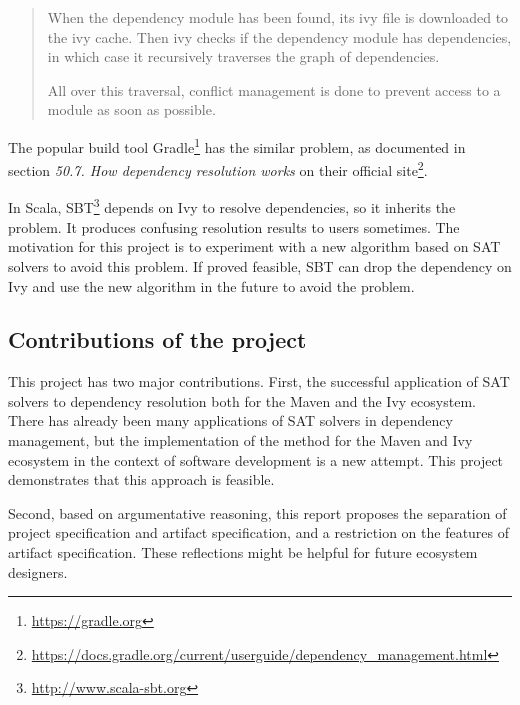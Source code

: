 \begin{quote}
  When the dependency module has been found, its ivy file is downloaded to the ivy cache. Then ivy checks if the dependency module has dependencies, in which case it recursively traverses the graph of dependencies.

  All over this traversal, conflict management is done to prevent access to a module as soon as possible.
\end{quote}

The popular build tool Gradle\footnote{\url{https://gradle.org}} has the similar problem, as documented in section \emph{50.7. How dependency resolution works} on their official site\footnote{\url{https://docs.gradle.org/current/userguide/dependency_management.html}}.

In Scala, SBT\footnote{\url{http://www.scala-sbt.org}} depends on Ivy to resolve dependencies, so it inherits the problem. It produces confusing resolution results to users sometimes. The motivation for this project is to experiment with a new algorithm based on SAT solvers to avoid this problem. If proved feasible, SBT can drop the dependency on Ivy and use the new algorithm in the future to avoid the problem.

\subsection{Contributions of the project}

This project has two major contributions. First, the successful application of SAT solvers to dependency resolution both for the Maven and the Ivy ecosystem. There has already been many applications of SAT solvers in dependency management\cite{mancinelli2006managing, berre2009dependency, vouillon2013software}, but the implementation of the method for the Maven and Ivy ecosystem in the context of software development is a new attempt. This project demonstrates that this approach is feasible.

Second, based on argumentative reasoning, this report proposes the separation of project specification and artifact specification, and a restriction on the features of artifact specification. These reflections might be helpful for future ecosystem designers.
